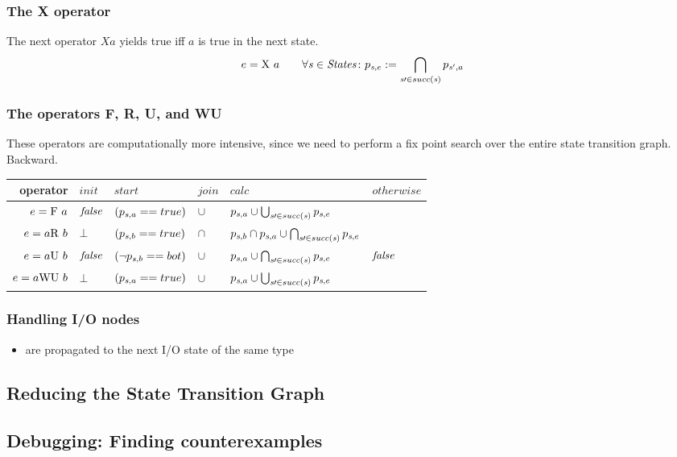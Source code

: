 \subsubsection{The X operator}
The next operator $X a$ yields true iff $a$ is true in the next state.
\[ e = \mathrm{X}\  a \qquad\forall\mathit{s}\in\mathit{States}\colon p_{\mathit{s},e}:=\bigcap_{\mathit{s}\prime\in succ(\mathit{s})}{p_{\mathit{s}',a}} \]

\subsubsection{The operators F, R, U, and WU}
These operators are computationally more intensive, since we need to
perform a fix point search over the entire state transition graph. Backward.
\begin{tabular}{rlllll}
\toprule
operator & $\mathit{init}$ & $\mathit{start}$ & $\mathit{join}$ &
$\mathit{calc}$ & $\mathit{otherwise}$ \\\midrule

$e = \mathrm{F}\  a$  & $\mathit{false}$ & $(p_{\mathit{s},a}==true)$ & $\cup$ & 
$p_{\mathit{s},a}\cup\bigcup_{\mathit{s}\prime\in succ(\mathit{s})}{p_{\mathit{s},e}}$ &\\

$e = a \mathrm{R}\  b$ & $\bot$ & $(p_{\mathit{s},b}==true)$ & $\cap$ &
$p_{\mathit{s},b} \cap p_{\mathit{s},a} \cup \bigcap_{\mathit{s}\prime\in succ(\mathit{s})}{p_{\mathit{s},e}}$\\

$e = a \mathrm{U}\  b$ & $\mathit{false}$ & $(\neg p_{\mathit{s},b}==bot)$ &
$\cup$ & $p_{\mathit{s},a} \cup\bigcap_{\mathit{s}\prime\in succ(\mathit{s})}{p_{\mathit{s},e}}$ & $\mathit{false}$\\

$e = a \mathrm{WU}\  b$ & $\bot$ & $(p_{\mathit{s},a}==true)$ & $\cup$ &
$p_{\mathit{s},a} \cup \bigcup_{\mathit{s}\prime\in succ(\mathit{s})}{p_{\mathit{s},e}}$\\\bottomrule
\end{tabular}


\subsubsection{Handling I/O nodes}
\begin{itemize}
\item are propagated to the next I/O state of the same type
\end{itemize}

\subsection{Reducing the State Transition Graph}

\subsection{Debugging: Finding counterexamples}